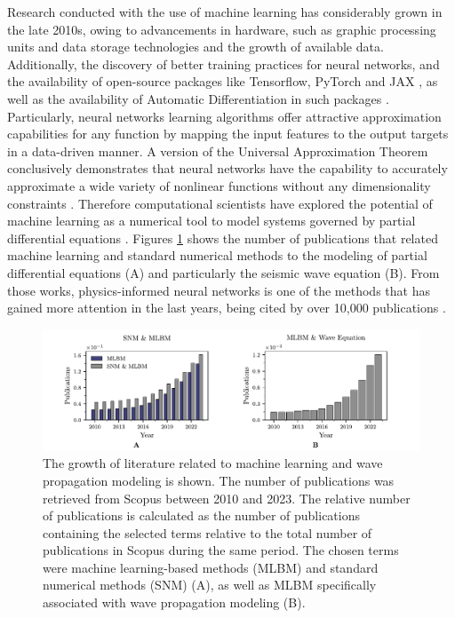 \documentclass[11pt,twoside]{article}
\begin{document}
Research conducted with the use of machine learning has considerably grown in the late 2010s, owing to advancements 
in hardware, such as graphic processing units and data storage technologies and the growth of available data. 
Additionally, the discovery of better training practices for neural networks, and the availability of open-source 
packages like Tensorflow, PyTorch and JAX \citep{abadi_tensorflow_2016,paszke_pytorch_2019,jax2018github}, as well 
as the availability of Automatic Differentiation in such packages \citep{paszke_automatic_2017,baydin_automatic_2017}. 
Particularly, neural networks learning algorithms offer attractive approximation capabilities for any function by 
mapping the input features to the output targets in a data-driven manner. A version of the Universal Approximation 
Theorem conclusively demonstrates that neural networks have the capability to accurately approximate a wide 
variety of nonlinear functions without any dimensionality constraints \citep{barron_universal_1993}. Therefore 
computational scientists have explored the potential of machine learning as a numerical tool to model systems governed 
by partial differential equations \citep{cuomo_scientific_2022,karniadakis_physics-informed_2021}. Figures 
\ref{fig:publications_absolute_relative} shows the number of publications that related machine 
learning and standard numerical methods to the modeling of partial differential equations (A) and particularly
the seismic wave equation (B). From those works, physics-informed neural networks is one of the methods that 
has gained more attention in the last years, being cited by over 10,000 publications \citep{Raissi2019}.

\begin{figure}[H]
\centering
    \includegraphics[width=1.0\textwidth]{figs/publications_year.pdf}
    \caption{The growth of literature related to machine learning and wave propagation modeling is shown. 
    The number of publications was retrieved from Scopus between 2010 and 2023. The relative number of publications 
    is calculated as the number of publications containing the selected terms relative to the total number of 
    publications in Scopus during the same period. The chosen terms were machine learning-based methods (MLBM) 
    and standard numerical methods (SNM) (A), as well as MLBM specifically associated with wave propagation 
    modeling (B).} 
    \label{fig:publications_absolute_relative}
\end{figure}
\end{document}
